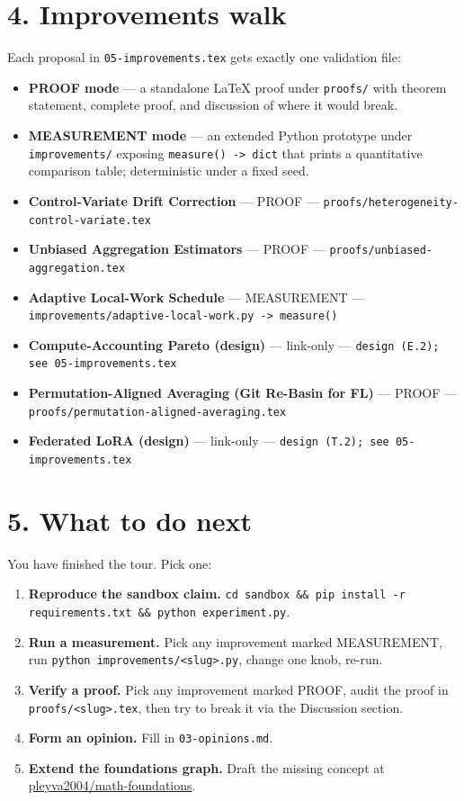 \documentclass[11pt]{article}
\begin{document}
\section*{4. Improvements walk}

Each proposal in \texttt{05-improvements.tex} gets exactly one validation file:
\begin{itemize}[leftmargin=*]
  \item \textbf{PROOF mode} --- a standalone LaTeX proof under \texttt{proofs/} with theorem statement, complete proof, and discussion of where it would break.
  \item \textbf{MEASUREMENT mode} --- an extended Python prototype under \texttt{improvements/} exposing \texttt{measure() -> dict} that prints a quantitative comparison table; deterministic under a fixed seed.
\end{itemize}

\begin{itemize}[leftmargin=*]
  \item \textbf{Control-Variate Drift Correction} --- PROOF --- \texttt{proofs/heterogeneity-control-variate.tex}
  \item \textbf{Unbiased Aggregation Estimators} --- PROOF --- \texttt{proofs/unbiased-aggregation.tex}
  \item \textbf{Adaptive Local-Work Schedule} --- MEASUREMENT --- \texttt{improvements/adaptive-local-work.py -> measure()}
  \item \textbf{Compute-Accounting Pareto (design)} --- link-only --- \texttt{design (E.2); see 05-improvements.tex}
  \item \textbf{Permutation-Aligned Averaging (Git Re-Basin for FL)} --- PROOF --- \texttt{proofs/permutation-aligned-averaging.tex}
  \item \textbf{Federated LoRA (design)} --- link-only --- \texttt{design (T.2); see 05-improvements.tex}
\end{itemize}

\section*{5. What to do next}

You have finished the tour. Pick one:
\begin{enumerate}[leftmargin=*]
  \item \textbf{Reproduce the sandbox claim.} \texttt{cd sandbox \&\& pip install -r requirements.txt \&\& python experiment.py}.
  \item \textbf{Run a measurement.} Pick any improvement marked MEASUREMENT, run \texttt{python improvements/<slug>.py}, change one knob, re-run.
  \item \textbf{Verify a proof.} Pick any improvement marked PROOF, audit the proof in \texttt{proofs/<slug>.tex}, then try to break it via the Discussion section.
  \item \textbf{Form an opinion.} Fill in \texttt{03-opinions.md}.
  \item \textbf{Extend the foundations graph.} Draft the missing concept at \href{https://github.com/pleyva2004/math-foundations}{pleyva2004/math-foundations}.
\end{enumerate}
\end{document}
